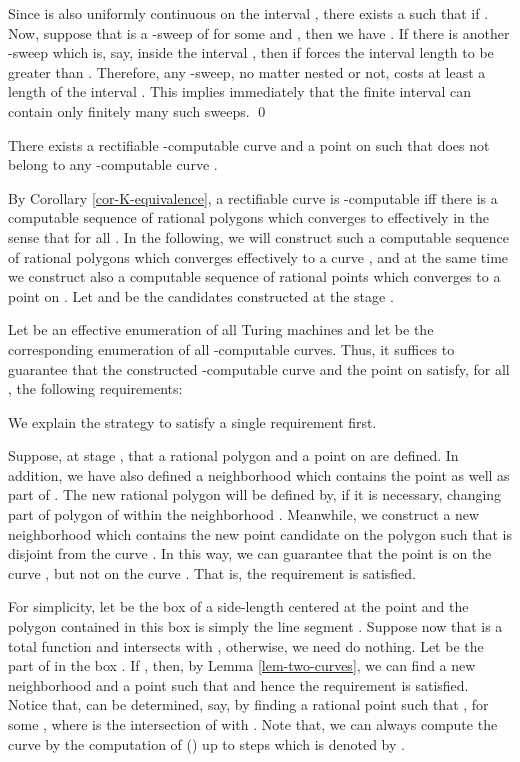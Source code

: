 \documentclass{LMCS}
\theoremstyle{plain}
\begin{document}
\proof
Since  is also uniformly continuous on the interval , there exists a  such that  if . Now, suppose that   is a -sweep of  for some  and  , then we have . If there is another -sweep  which is, say, inside the interval , then if forces the interval length  to be greater than . Therefore, any -sweep, no matter nested or not,  costs at least a length  of the interval .  This implies immediately that the finite interval  can contain only finitely many such sweeps.
\qed


\begin{thm}\label{Thm-K-R-sep}
There exists a rectifiable -computable curve  and a point  on  such that  does not belong to any -computable curve .
\end{thm}
\proof By Corollary \ref{cor-K-equivalence}, a rectifiable curve  is -computable iff there is a computable sequence  of rational polygons which converges to  effectively in the sense that  for all . In the following, we will construct such a computable sequence  of rational polygons which converges effectively to a curve , and at the same time we construct also a computable sequence  of rational points which converges to a point  on . Let  and  be the candidates  constructed at the stage .

Let  be an effective enumeration of all Turing machines and let  be the corresponding enumeration of all -computable curves. Thus, it suffices to guarantee that the constructed -computable curve  and the point  on  satisfy, for all , the following requirements:


We explain the strategy to satisfy a single requirement  first.

Suppose, at stage , that a rational polygon  and a point  on  are defined. In addition, we have also defined a neighborhood  which contains the point  as well as part of . The new rational polygon  will be defined by, if it is necessary, changing part of polygon of  within the neighborhood . Meanwhile, we construct a new neighborhood  which contains the new point candidate  on the polygon  such that  is disjoint from the curve . In this way, we can guarantee that the point  is on the curve , but not on the curve . That is, the requirement  is satisfied.

For simplicity, let  be the box of a side-length  centered at the point  and the polygon  contained in this box is simply the line segment .  Suppose now that  is a total function and  intersects with , otherwise, we need do nothing. Let  be the part of  in the box . If , then, by Lemma \ref{lem-two-curves}, we can find a new neighborhood  and  a point  such that  and hence the requirement  is satisfied. Notice that,  can be determined, say,  by finding a rational point  such that , for some , where  is the intersection of  with . Note that, we can always compute the curve  by the computation of  () up to  steps which is denoted by .
\end{document}
